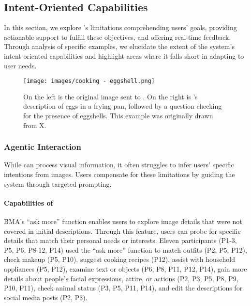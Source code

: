 \subsection{Intent-Oriented Capabilities}

In this section, we explore \sbma's limitations  comprehending users' goals, providing actionable support to fulfill these objectives, and offering real-time feedback. 
% 
Through analysis of specific examples, we elucidate the extent of the system's intent-oriented capabilities and highlight areas where it falls short in adapting to user needs. 



\begin{figure}[t!]
\centering
\texttt{[image: images/cooking - eggshell.png]}
\caption{On the left is the original image sent to \bma. On the right is \bma's description of eggs in a frying pan, followed by a question checking for the presence of eggshells. This example was originally drawn from X.}
\label{eggshells}
\end{figure}


\subsubsection{Agentic Interaction}
\label{agentic_interaction}

While \bma{} can process visual information, it often struggles to infer users' specific intentions from images. Users compensate for these limitations by guiding the system through targeted prompting. 


\paragraph{Capabilities of \bma}



BMA's ``ask more'' function enables users to explore image details that were not covered in initial descriptions. Through this feature, users can probe for specific details that match their personal needs or interests.
% 
Eleven participants (P1-3, P5, P6, P8-12, P14) used the ``ask more'' function to 
match outfits (P2, P5, P12),
check makeup (P5, P10), 
suggest cooking recipes (P12), 
assist with household appliances (P5, P12), 
examine text or objects (P6, P8, P11, P12, P14),
gain more details about people's facial expressions, attire, or actions (P2, P3, P5, P8, P9, P10, P11), 
check animal status (P3, P5, P11, P14), 
and edit the descriptions for social media posts (P2, P3). 



